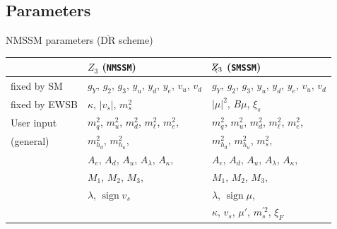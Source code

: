 \documentclass[hyperref={pdfpagelabels=false},ngerman]{beamer}
\DeclareMathOperator{\sign}{sign}
\newcommand{\DRbar}{\ensuremath{\overline{\text{DR}}}}
\newcommand{\Zv}{\ensuremath{\backslash\mkern-11.0mu{Z_3}}}
\begin{document}
\subsection{Parameters}

\begin{frame}{NMSSM parameters ($\DRbar$ scheme)}
  \begin{table}[tbh]
    \footnotesize
    \centering
    \begin{tabularx}{\textwidth}{lXX}
      \toprule
      & $Z_3$ (\texttt{NMSSM}) & $\Zv$ (\texttt{SMSSM})\\
      \midrule
      fixed by SM
      & $g_Y$, $g_2$, $g_3$, $y_u$, $y_d$, $y_e$, $v_u$, $v_d$
      & $g_Y$, $g_2$, $g_3$, $y_u$, $y_d$, $y_e$, $v_u$, $v_d$
      \\\midrule
      fixed by EWSB
      & $\kappa$, $|v_s|$, $m_s^2$
      & $|\mu|^2$, $B\mu$, $\xi_s$
      \\\midrule
      User input
      & $m_q^2$, $m_u^2$,  $m_d^2$, $m_\ell^2$, $m_e^2$,
      & $m_q^2$, $m_u^2$,  $m_d^2$, $m_\ell^2$, $m_e^2$,\\
      (general)
      & $m_{h_d}^2$, $m_{h_u}^2$,
      & $m_{h_d}^2$, $m_{h_u}^2$, $m_s^2$,\\
      & $A_e$, $A_d$, $A_u$, $A_\lambda$, $A_\kappa$,
      & $A_e$, $A_d$, $A_u$, $A_\lambda$, $A_\kappa$,
      \\
      & $M_1$, $M_2$, $M_3$,
      & $M_1$, $M_2$, $M_3$,
      \\
      & $\lambda$, $\sign v_s$
      & $\lambda$, $\sign\mu$,
      \\
      & & $\kappa$, $v_s$, $\mu'$, $m_s^{\prime 2}$, $\xi_F$
      \\\bottomrule
    \end{tabularx}
  \end{table}
\end{frame}
\end{document}
